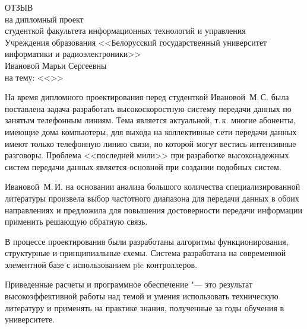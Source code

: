 

\thispagestyle{empty}

\begin{singlespace}

{\small
  \begin{center}
    \begin{minipage}{0.8\textwidth}
      \begin{center}
        {\normalsize ОТЗЫВ}\\[1em]
        на дипломный проект\\студенткой факультета информационных технологий 
        и управления\\Учреждения образования <<Белорусский государственный университет информатики и радиоэлектроники>>\\
        Ивановой Марьи Сергеевны\\
        на тему: <<\topicName>>
      \end{center}
    \end{minipage}
  \end{center}

На время дипломного проектирования перед студенткой Ивановой~М.\,С. была поставлена задача разработать высокоскоростную систему передачи данных по занятым телефонным линиям.
Тема является актуальной, т.\,к. многие абоненты, имеющие дома компьютеры, для выхода на коллективные сети передачи данных имеют только телефонную линию связи, по которой могут вестись интенсивные разговоры.
Проблема <<последней мили>> при разработке высоконадежных систем передачи данных является основной при создании подобных систем.

Ивановой~М.\,И. на основании анализа большого количества специализированной литературы произвела выбор частотного диапазона для передачи данных в обоих направлениях и предложила для повышения достоверности передачи информации применить решающую обратную связь.

В процессе проектирования были разработаны алгоритмы функционирования, структурные и принципиальные схемы.
Система разработана на современной элементной базе с использованием pic контроллеров.

Приведенные расчеты и программное обеспечение "--- это результат высокоэффективной работы над темой и умения использовать техническую литературу и применять на практике знания, полученные за годы обучения в университете.

}
\end{singlespace}
